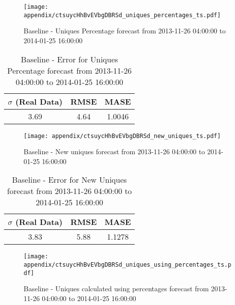 \begin{figure}[H] \begin{center} \leavevmode
\texttt{[image: appendix/ctsuycHhBvEVbgDBRSd\_uniques\_percentages\_ts.pdf]} \caption{
Baseline - Uniques Percentage forecast from 2013-11-26 04:00:00 to 2014-01-25 16:00:00} \label{fig:appendix/ctsuycHhBvEVbgDBRSd_uniques_percentages_ts.pdf} \end{center}
\end{figure}

\begin{table}[H]
\centering
\footnotesize
\begin{tabular}{ccc}
$\sigma$ (Real Data) & RMSE & MASE   \\ \hline
3.69 & 4.64 & 1.0046 \\
\end{tabular}

\vspace{0.5cm}

\caption{
Baseline - Error for Uniques Percentage forecast from 2013-11-26 04:00:00 to 2014-01-25 16:00:00}
\end{table}

\begin{figure}[H] \begin{center} \leavevmode
\texttt{[image: appendix/ctsuycHhBvEVbgDBRSd\_new\_uniques\_ts.pdf]} \caption{
Baseline - New uniques forecast from 2013-11-26 04:00:00 to 2014-01-25 16:00:00} \label{fig:appendix/ctsuycHhBvEVbgDBRSd_new_uniques_ts.pdf} \end{center}
\end{figure}

\begin{table}[H]
\centering
\footnotesize
\begin{tabular}{ccc}
$\sigma$ (Real Data) & RMSE & MASE   \\ \hline
3.83 & 5.88 & 1.1278 \\
\end{tabular}

\vspace{0.5cm}

\caption{
Baseline - Error for New Uniques forecast from 2013-11-26 04:00:00 to 2014-01-25 16:00:00}
\end{table}

\begin{figure}[H] \begin{center} \leavevmode
\texttt{[image: appendix/ctsuycHhBvEVbgDBRSd\_uniques\_using\_percentages\_ts.pdf]} \caption{
Baseline - Uniques calculated using percentages forecast from 2013-11-26 04:00:00 to 2014-01-25 16:00:00} \label{fig:appendix/ctsuycHhBvEVbgDBRSd_uniques_using_percentages_ts.pdf} \end{center}
\end{figure}

